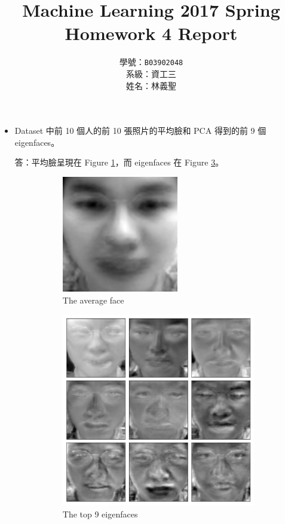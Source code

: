 \documentclass[12pt,a4paper]{extarticle}
\title{Machine Learning 2017 Spring\\Homework 4 Report}
\author{學號：\texttt{B03902048}\\系級：資工三\\姓名：林義聖}
\date{}
\begin{document}
\maketitle

\begin{itemize}

  \item[1.1] Dataset 中前 10 個人的前 10 張照片的平均臉和 PCA 得到的前 9 個 eigenfaces。
  \par 答：平均臉呈現在 Figure \ref{fig:average-face}，而 eigenfaces 在 Figure \ref{fig:top-9-eigenfaces}。

  \begin{figure}[ht]
    \begin{subfigure}[t]{0.5\textwidth}
      \centering
      \includegraphics[width=0.8\linewidth]{average-face.png}
      \caption{The average face}
      \label{fig:average-face}
    \end{subfigure}
    \begin{subfigure}[t]{0.5\textwidth}
      \centering
      \includegraphics[width=0.8\linewidth]{eigen-faces-top-9.png}
      \caption{The top 9 eigenfaces}
      \label{fig:top-9-eigenfaces}
    \end{subfigure}
    \caption{}
  \end{figure}


\end{itemize}
\end{document}
